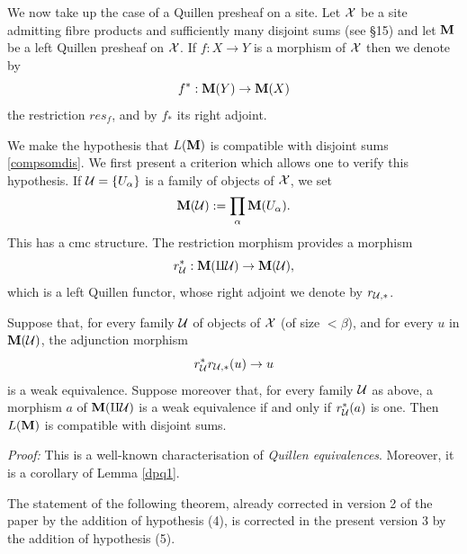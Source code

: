 \bigskip

We now take up the case of a Quillen presheaf
on a site. Let ${\cal X}$ be a site admitting fibre products and sufficiently
many disjoint sums (see \S 15) and let ${\bf M}$ be a left Quillen presheaf
on ${\cal X}$.
If $f:X\rightarrow Y$ is a
morphism of ${\cal X}$ then we denote by
$$
f^{\ast}: {\bf M} (Y)\rightarrow {\bf M} (X)
$$
the restriction $res_f$, and by $f_{\ast}$ its right adjoint.

We make the hypothesis that $L({\bf M} )$ is compatible with disjoint sums
\ref{compsomdis}. We first present a criterion which allows one to verify
this hypothesis.
If ${\cal U} = \{ U_{\alpha}\}$ is a family of objects of ${\cal X}$, we set
$$
{\bf M} ({\cal U} ):= \prod _{\alpha} {\bf M} (U_{\alpha}).
$$
This has a cmc structure.
The restriction morphism provides a morphism
$$
r_{{\cal U}}^{\ast}:{\bf M} (\amalg {\cal U} )\rightarrow {\bf M} ({\cal U} ),
$$
which is a
left Quillen functor,
whose right adjoint we denote by $r_{{\cal U} , \ast}$.

\begin{corollary}
\label{compsomcritere}
Suppose that, for every family ${\cal U}$ of objects of ${\cal X}$ (of size $<\beta$),
and for every $u$ in ${\bf M} ({\cal U} )$, the adjunction morphism
$$
r_{{\cal U}}^{\ast} r_{{\cal U} , \ast} (u)\rightarrow u
$$
is a weak equivalence. Suppose moreover that, for every family ${\cal U}$
as above, a
morphism $a$ of ${\bf M} (\amalg {\cal U} )$ is a weak equivalence
if and only if $r_{{\cal U}}^{\ast} (a)$ is one. Then
$L({\bf M} )$ is compatible with disjoint sums.
\end{corollary}
{\em Proof:} This is a well-known characterisation of {\em Quillen
equivalences}. Moreover, it is a corollary of Lemma \ref{dpq1}.
\eop

The statement of the following theorem, already corrected in
version 2 of the paper by the addition of hypothesis (4), is corrected in the
present version 3 by the addition of
hypothesis (5).


